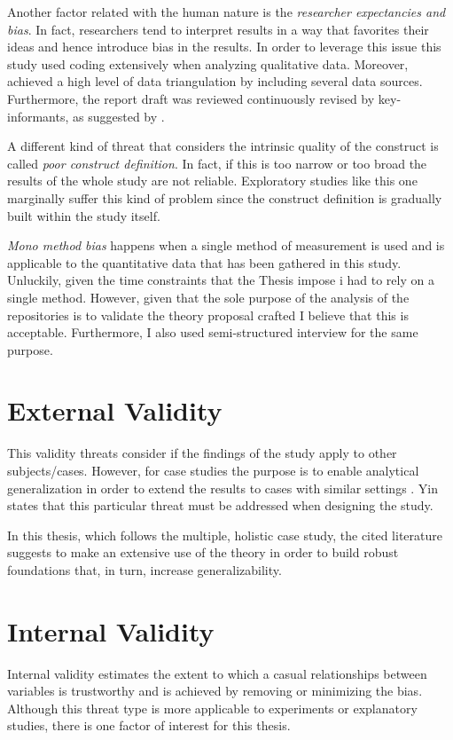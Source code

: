     Another factor related with the human nature is the \textit{researcher expectancies and bias}. In fact, researchers tend to interpret results in a way that favorites their ideas and hence introduce bias in the results. In order to leverage this issue this study used coding extensively when analyzing qualitative data. Moreover, achieved a high level of data triangulation by including several data sources. Furthermore, the report draft was reviewed continuously revised by key-informants, as suggested by \cite{case_study_guide}.

    A different kind of threat that considers the intrinsic quality of the construct is called \textit{poor construct definition}. In fact, if this is too narrow or too broad the results of the whole study are not reliable. Exploratory studies like this one marginally suffer this kind of problem since the construct definition is gradually built within the study itself.

    \textit{Mono method bias} happens when a single method of measurement is used and is applicable to the quantitative data that has been gathered in this study. Unluckily, given the time constraints that the Thesis impose i had to rely on a single method. However, given that the sole purpose of the analysis of the repositories is to validate the theory proposal crafted I believe that this is acceptable. Furthermore, I also used semi-structured interview for the same purpose.

\section{External Validity}
This validity threats consider if the findings of the study apply to other subjects/cases. However, for case studies the purpose is to enable analytical generalization in order to extend the results to cases with similar settings \cite{case_study_software_engineering}. Yin \cite{case_study_guide} states that this particular threat must be addressed when designing the study.

In this thesis, which follows the multiple, holistic case study, the cited literature suggests to make an extensive use of the theory in order to build robust foundations that, in turn, increase generalizability.


\section{Internal Validity}
Internal validity estimates the extent to which a casual relationships between variables is trustworthy and is achieved by removing or minimizing the bias. Although this threat type is more applicable to experiments or explanatory studies, there is one factor of interest for this thesis.


